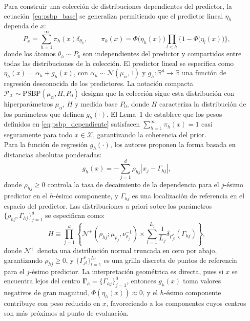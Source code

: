 Para construir una colección de distribuciones dependientes del predictor, la ecuación~\eqref{eq:psbp_base} se generaliza permitiendo que el predictor lineal $\eta_h$ dependa de $x$:
\begin{equation}\label{eq:psbp_dependiente}
    P_x = \sum_{h=1}^{\infty} \pi_h(x) \delta_{\theta_h},
    \qquad \pi_h(x) = \Phi\bigl(\eta_h(x)\bigr)
    \prod_{l < h}\bigl\{1 - \Phi\bigl(\eta_l(x)\bigr)\bigr\},
\end{equation}
donde los átomos $\theta_h \sim P_0$ son independientes del predictor y compartidos entre todas las distribuciones de la colección. El predictor lineal se especifica como $\eta_h(x) = \alpha_h + g_h(x)$, con $\alpha_h \sim \mathcal{N}(\mu_\alpha, 1)$ y $g_h : \mathbb{R}^d \to \mathbb{R}$ una función de regresión desconocida de los predictores. La notación compacta $\mathcal{P}_{\mathcal{X}} \sim \mathrm{PSBP}(\mu_\alpha, H, P_0)$ designa que la colección sigue esta distribución con hiperparámetros $\mu_\alpha$, $H$ y medida base $P_0$, donde $H$ caracteriza la distribución de los parámetros que definen $g_h(\cdot)$. El Lema~1 de \citet{03_02_chung2009nonparametric} establece que los pesos definidos en \eqref{eq:psbp_dependiente} satisfacen $\sum_{h=1}^{\infty}\pi_h(x) = 1$ casi seguramente para todo $x \in \mathcal{X}$, garantizando la coherencia del prior.\\
 
Para la función de regresión $g_h(\cdot)$, los autores proponen la forma basada en distancias absolutas ponderadas:
\begin{equation}\label{eq:fh_kernel}
    g_h(x) = -\sum_{j=1}^{d} \rho_{hj} |x_j - \Gamma_{hj}|,
\end{equation}
donde $\rho_{hj} \geq 0$ controla la tasa de decaimiento de la dependencia para el $j$-ésimo predictor en el $h$-ésimo componente, y $\Gamma_{hj}$ es una localización de referencia en el espacio del predictor. Las distribuciones a priori sobre los parámetros $\{\rho_{hj}, \Gamma_{hj}\}_{j=1}^{d}$ se especifican como:
\begin{equation}\label{eq:prior_phi}
    H \equiv \prod_{j=1}^{d} \left\{
        \mathcal{N}^+\!\left(\rho_{hj}; \mu_{\rho_j},
        \nu_{\rho_j}^{-1}\right)
        \times \sum_{l=1}^{L_j} \frac{1}{L_j}
        \delta_{\Gamma_{jl}^*}(\Gamma_{hj})
    \right\},
\end{equation}
donde $\mathcal{N}^+$ denota una distribución normal truncada en cero por abajo, garantizando $\rho_{hj} \geq 0$, y $\{\Gamma_{jl}^*\}_{l=1}^{L_j}$ es una grilla discreta de puntos de referencia para el $j$-ésimo predictor. La interpretación geométrica es directa, pues si $x$ se encuentra lejos del centro $\boldsymbol{\Gamma}_h = \{\Gamma_{hj}\}_{j=1}^{d}$, entonces $g_h(x)$ toma valores negativos de gran magnitud, $\Phi(\eta_h(x)) \approx 0$, y el $h$-ésimo componente contribuye con peso reducido en $x$, favoreciendo a los componentes cuyos centros son más próximos al punto de evaluación.
 
